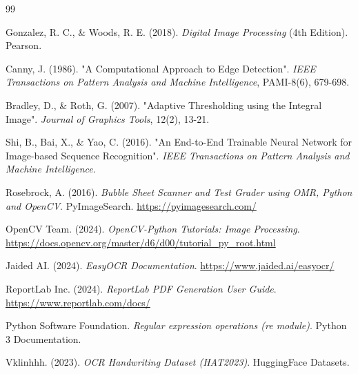 \documentclass[6pt, a4paper]{report}
\begin{document}
	\begin{thebibliography}{99}
		
		Gonzalez, R. C., \& Woods, R. E. (2018). \textit{Digital Image Processing} (4th Edition). Pearson.
		
		Canny, J. (1986). "A Computational Approach to Edge Detection". \textit{IEEE Transactions on Pattern Analysis and Machine Intelligence}, PAMI-8(6), 679-698.
		
		Bradley, D., \& Roth, G. (2007). "Adaptive Thresholding using the Integral Image". \textit{Journal of Graphics Tools}, 12(2), 13-21.
		
		Shi, B., Bai, X., \& Yao, C. (2016). "An End-to-End Trainable Neural Network for Image-based Sequence Recognition". \textit{IEEE Transactions on Pattern Analysis and Machine Intelligence}.
		
		Rosebrock, A. (2016). \textit{Bubble Sheet Scanner and Test Grader using OMR, Python and OpenCV}. PyImageSearch. \url{https://pyimagesearch.com/}
		
		OpenCV Team. (2024). \textit{OpenCV-Python Tutorials: Image Processing}. \url{https://docs.opencv.org/master/d6/d00/tutorial_py_root.html}
		
		Jaided AI. (2024). \textit{EasyOCR Documentation}. \url{https://www.jaided.ai/easyocr/}
		
		ReportLab Inc. (2024). \textit{ReportLab PDF Generation User Guide}. \url{https://www.reportlab.com/docs/}
		
		Python Software Foundation. \textit{Regular expression operations (re module)}. Python 3 Documentation.
		
		Vklinhhh. (2023). \textit{OCR Handwriting Dataset (HAT2023)}. HuggingFace Datasets.
		
	\end{thebibliography}
	
\end{document}
